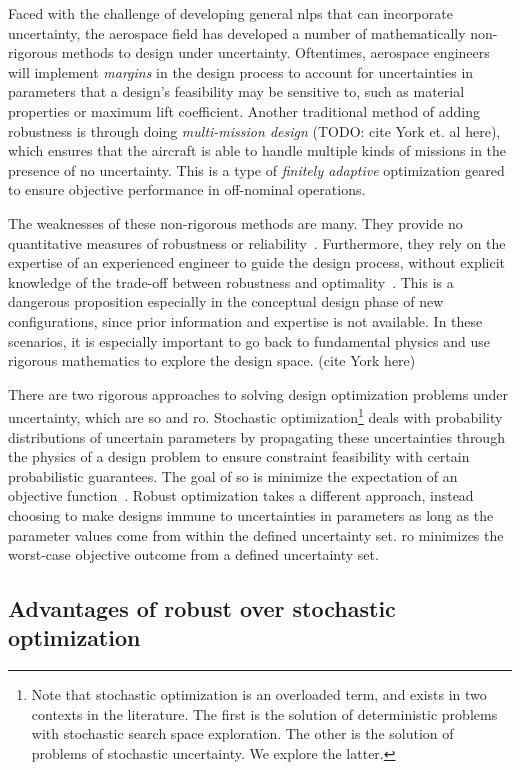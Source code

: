 Faced with the challenge of developing general \gls{nlp}s that can incorporate uncertainty,
the aerospace field has developed a number of mathematically non-rigorous methods to
design under uncertainty. Oftentimes, aerospace engineers will implement
\textit{margins} in the design process to account for uncertainties in parameters that a design's feasibility
may be sensitive to, such as material properties or maximum lift coefficient.
Another traditional method of adding robustness is through doing \textit{multi-mission design}
(TODO: cite York et. al here), which ensures that the aircraft is able to handle
multiple kinds of missions in the presence of no uncertainty. This is a type of \textit{finitely
adaptive} optimization geared to ensure objective performance in off-nominal operations.

The weaknesses of these non-rigorous methods are many. They provide no quantitative measures of
robustness or reliability~\cite{Zang2002}. Furthermore, they rely on the expertise of an experienced
engineer to guide the design process, without explicit knowledge of the trade-off between
robustness and optimality~\cite{Yao2011}. This is a dangerous proposition especially in the
conceptual design phase of new configurations, since prior information and expertise is not
available. In these scenarios, it is especially important to go back to fundamental physics
and use rigorous mathematics to explore the design space. (cite York here)

There are two rigorous approaches to solving design optimization problems under uncertainty,
which are \gls{so} and \gls{ro}. Stochastic optimization\footnote{Note that stochastic
optimization is an overloaded term, and exists in two contexts in the literature. The first is the solution
of deterministic problems with stochastic search space exploration. The other is the solution
of problems of stochastic uncertainty. We explore the latter.}
deals with probability distributions of
uncertain parameters by propagating these uncertainties through the
physics of a design problem to ensure constraint feasibility with certain probabilistic guarantees.
The goal of \gls{so} is minimize the expectation of an objective function~\cite{Diwekar2008}.
Robust optimization takes a different approach, instead choosing to make designs immune to
uncertainties in parameters as long as the parameter values come from within the defined
uncertainty set. \gls{ro} minimizes the worst-case objective outcome from a defined uncertainty set.

\subsection{Advantages of robust over stochastic optimization}

